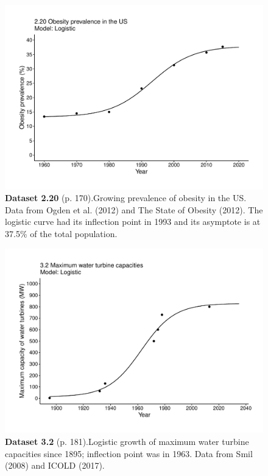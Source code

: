 \documentclass[aps,rmp,preprint,superscriptaddress,10pt,onecolumn]{article}
\begin{document}
\clearpage
\begin{figure}[h]
\includegraphics[width=\textwidth]{output/figs-ggplot/2.20.pdf}
\caption*{\textbf{Dataset 2.20} (p. 170).Growing prevalence of obesity in the US. Data from Ogden et al. (2012) and The State of Obesity (2012). The logistic curve had its inflection point in 1993 and its asymptote is at 37.5\% of the total population.}
\end{figure}
	
\clearpage
\begin{figure}[h]
\includegraphics[width=\textwidth]{output/figs-ggplot/3.2.pdf}
\caption*{\textbf{Dataset 3.2} (p. 181).Logistic growth of maximum water turbine capacities since 1895; inflection point was in 1963. Data from Smil (2008) and ICOLD (2017).}
\end{figure}
	
\end{document}
